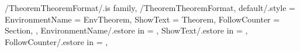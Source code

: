 \newcommand{\MappingTheoremCounter}[2][\empty]
{%
  \ifthenelse{\equal{#2}{Section}}%
  {%
    \MappingTheoremCounterResetCounter[#1]{section}%
  }{}%
  \ifthenelse{\equal{#2}{Definition}}%
  {%
    \MappingTheoremCounterResetCounter[#1]{%
      \GetTheoremDefinitionFormatFollowCounter}%
  }{}%
  \ifthenelse{\equal{#2}{Condition}}%
  {%
    \MappingTheoremCounterResetCounter[#1]{%
      \GetTheoremConditionFormatFollowCounter}%
  }{}%
  \ifthenelse{\equal{#2}{Theorem}}%
  {%
    \MappingTheoremCounterResetCounter[#1]{%
      \GetTheoremTheoremFormatFollowCounter}%
  }{}%
  \ifthenelse{\equal{#2}{Lemma}}%
  {%
    \MappingTheoremCounterResetCounter[#1]{%
      \GetTheoremLemmaFormatFollowCounter}%
  }{}%
  \ifthenelse{\equal{#2}{Example}}%
  {%
    \MappingTheoremCounterResetCounter[#1]{%
      \GetTheoremExampleFormatFollowCounter}%
  }{}%
  \ifthenelse{\equal{#2}{Proposition}}%
  {%
    \MappingTheoremCounterResetCounter[#1]{%
      \GetTheoremPropositionFormatFollowCounter}%
  }{}%
  \ifthenelse{\equal{#2}{Conjecture}}%
  {%
    \MappingTheoremCounterResetCounter[#1]{%
      \GetTheoremConjectureFormatFollowCounter}%
  }{}%
  \ifthenelse{\equal{#2}{Criterion}}%
  {%
    \MappingTheoremCounterResetCounter[#1]{%
      \GetTheoremCriterionFormatFollowCounter}%
  }{}%
  \ifthenelse{\equal{#2}{Assertion}}%
  {%
    \MappingTheoremCounterResetCounter[#1]{%
      \GetTheoremAssertionFormatFollowCounter}%
  }{}%
  \ifthenelse{\equal{#2}{Question}}%
  {%
    \MappingTheoremCounterResetCounter[#1]{%
      \GetTheoremQuestionFormatFollowCounter}%
  }{}%
  \ifthenelse{\equal{#2}{Hypothesis}}%
  {%
    \MappingTheoremCounterResetCounter[#1]{%
      \GetTheoremHypothesisFormatFollowCounter}%
  }{}%
  \ifthenelse{\equal{#2}{Problem}}%
  {%
    \MappingTheoremCounterResetCounter[#1]{%
      \GetTheoremProblemFormatFollowCounter}%
  }{}%
  \ifthenelse{\equal{#2}{Corollary}}%
  {%
    \MappingTheoremCounterResetCounter[#1]{%
      \GetTheoremCorollaryFormatFollowCounter}%
  }{}%
} %


\pgfkeys
{
  /TheoremTheoremFormat/.is family, /TheoremTheoremFormat,
  default/.style =
  {
    EnvironmentName = {EnvTheorem},
    ShowText = {Theorem},
    FollowCounter = Section,
  },
  EnvironmentName/.estore in = \GetTheoremTheoremFormatEnvironmentName,
  ShowText/.estore in = \GetTheoremTheoremFormatShowText,
  FollowCounter/.estore in = \GetTheoremTheoremFormatFollowCounter,
} %

